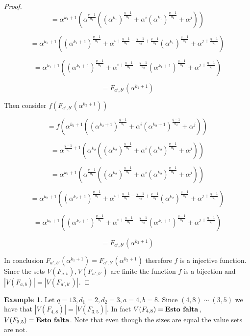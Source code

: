 \documentclass{article}
\theoremstyle{definition}
\newtheorem{example}[theorem]{Example}
\theoremstyle{remark}
\numberwithin{equation}{section}
\begin{document}
\begin{proof}
  $$= \alpha^{k_1+1}(\alpha^{\frac{q-1}{d_1}}((\alpha^{k_1})^{\frac{q-1}{d_1}} + \alpha^{i}(\alpha^{k_1})^{\frac{q-1}{d_2}} + \alpha^{j}))$$ 

  $$= \alpha^{k_1+1}((\alpha^{k_1+1})^{\frac{q-1}{d_1}} + \alpha^{i + \frac{q-1}{d_1} - \frac{q-1}{d_2} + \frac{q-1}{d_2}}(\alpha^{k_1})^{\frac{q-1}{d_2}} + \alpha^{j + \frac{q-1}{d_1}})$$

  $$= \alpha^{k_1+1}((\alpha^{k_1+1})^{\frac{q-1}{d_1}} + \alpha^{i + \frac{q-1}{d_1} - \frac{q-1}{d_2}}(\alpha^{k_1+1})^{\frac{q-1}{d_2}} + \alpha^{j + \frac{q-1}{d_1}})$$ 

  $$= F_{a', b'}(\alpha^{k_1+1})$$

  Then consider $f(F_{a', b'}(\alpha^{k_2+1}))$

  $$= f(\alpha^{k_2+1}((\alpha^{k_2+1})^{\frac{q-1}{d_1}} + \alpha^{i}(\alpha^{k_2+1})^{\frac{q-1}{d_2}} + \alpha^{j}))$$

  $$ = \alpha^{\frac{q-1}{d_1}+1}(\alpha^{k_2}((\alpha^{k_2})^{\frac{q-1}{d_1}} + \alpha^{i}(\alpha^{k_2})^{\frac{q-1}{d_2}} + \alpha^{j}))$$

  $$ = \alpha^{k_2+1}(\alpha^{\frac{q-1}{d_1}}((\alpha^{k_2})^{\frac{q-1}{d_1}} + \alpha^{i}(\alpha^{k_2})^{\frac{q-1}{d_2}} + \alpha^{j}))$$

  $$ = \alpha^{k_2+1}((\alpha^{k_2 + 1})^{\frac{q-1}{d_1}} + \alpha^{i + \frac{q-1}{d_1} - \frac{q-1}{d_2} + \frac{q-1}{d_2}}(\alpha^{k_2})^{\frac{q-1}{d_2}} + \alpha^{j + \frac{q-1}{d_1}})$$

  $$= \alpha^{k_2+1}((\alpha^{k_2 + 1})^{\frac{q-1}{d_1}} + \alpha^{i + \frac{q-1}{d_1} - \frac{q-1}{d_2}}(\alpha^{k_2 + 1})^{\frac{q-1}{d_2}} + \alpha^{j + \frac{q-1}{d_1}})$$

  $$= F_{a', b'}(\alpha^{k_2+1})$$

  In conclusion $F_{a', b'}(\alpha^{k_1+1}) = F_{a', b'}(\alpha^{k_2+1})$ therefore $f$ is a injective function. Since the sets $V(F_{a,b}), V(F_{a',b'})$ are finite the function $f$ is a bijection and $|V(F_{a,b})| = |V(F_{a',b'})|$.

\end{proof}

 \begin{example}
    Let $q = 13, d_1 = 2, d_2 = 3, a = 4, b = 8$. Since $(4,8) \sim (3,5)$ we have that $|V(F_{4, 8})| = |V(F_{3, 5})|$. In fact $V(F_{4, 8}) = \mbox{\textbf{Esto falta}}$, $V(F_{3, 5}) = \mbox{\textbf{Esto falta}}$. Note that even though the sizes are equal the value sets are not.
  \end{example}
\end{document}

